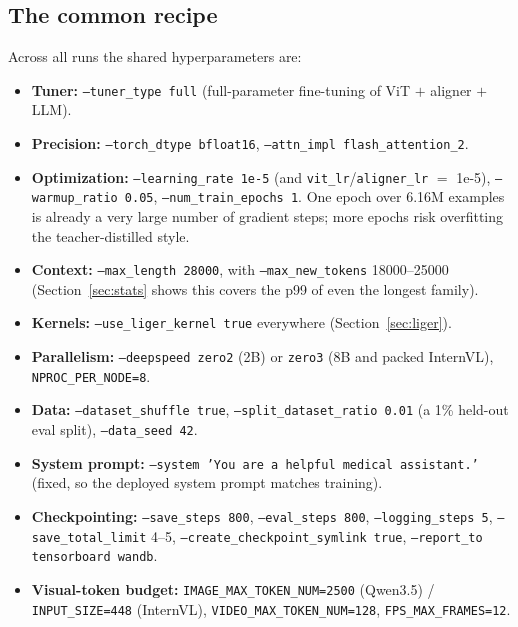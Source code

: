 \documentclass[11pt,a4paper]{article}
\begin{document}
\subsection{The common recipe}
Across all runs the shared hyperparameters are:
\begin{itemize}[leftmargin=1.4em]
  \item \textbf{Tuner:} \texttt{--tuner\_type full} (full-parameter fine-tuning of ViT $+$ aligner $+$ LLM).
  \item \textbf{Precision:} \texttt{--torch\_dtype bfloat16}, \texttt{--attn\_impl flash\_attention\_2}.
  \item \textbf{Optimization:} \texttt{--learning\_rate 1e-5} (and \texttt{vit\_lr}/\texttt{aligner\_lr} $=$ 1e-5), \texttt{--warmup\_ratio 0.05}, \texttt{--num\_train\_epochs 1}. One epoch over 6.16M examples is already a very large number of gradient steps; more epochs risk overfitting the teacher-distilled style.
  \item \textbf{Context:} \texttt{--max\_length 28000}, with \texttt{--max\_new\_tokens} 18000--25000 (Section~\ref{sec:stats} shows this covers the p99 of even the longest family).
  \item \textbf{Kernels:} \texttt{--use\_liger\_kernel true} everywhere (Section~\ref{sec:liger}).
  \item \textbf{Parallelism:} \texttt{--deepspeed zero2} (2B) or \texttt{zero3} (8B and packed InternVL), \texttt{NPROC\_PER\_NODE=8}.
  \item \textbf{Data:} \texttt{--dataset\_shuffle true}, \texttt{--split\_dataset\_ratio 0.01} (a 1\% held-out eval split), \texttt{--data\_seed 42}.
  \item \textbf{System prompt:} \texttt{--system 'You are a helpful medical assistant.'} (fixed, so the deployed system prompt matches training).
  \item \textbf{Checkpointing:} \texttt{--save\_steps 800}, \texttt{--eval\_steps 800}, \texttt{--logging\_steps 5}, \texttt{--save\_total\_limit} 4--5, \texttt{--create\_checkpoint\_symlink true}, \texttt{--report\_to tensorboard wandb}.
  \item \textbf{Visual-token budget:} \texttt{IMAGE\_MAX\_TOKEN\_NUM=2500} (Qwen3.5) / \texttt{INPUT\_SIZE=448} (InternVL), \texttt{VIDEO\_MAX\_TOKEN\_NUM=128}, \texttt{FPS\_MAX\_FRAMES=12}.
\end{itemize}
\end{document}
